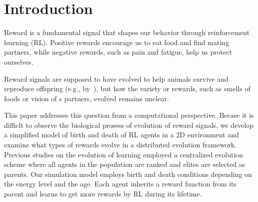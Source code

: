\section{Introduction}\label{sec:intro}
Reward is a fundamental signal that shapes our behavior through reinforcement learning (RL). 
Positive rewards encourage us to eat food and find mating partners, while negative rewards, such as pain and fatigue, help us protect ourselves. 

Reward signals are supposed to have evolved to help animals survive and reproduce offspring (e.g., by~\cite{schultzNeuronalRewardDecision2015}), but how the variety or rewards, such as smells of foods or vision of s partners, 
evolved remains unclear.

This paper addresses this question from a computational perspective. 
Becase it is difficlt to observe the biological prosess of evolution of reward signals, we develop a simplified model of birth and death of RL agents in a 2D environment and examine what types of rewards evolve in a
distributed evolution framework.
Previous studies on the evolution of learning \citep{hintonHowLearningCan1987,singhWhereRewardsCome2009} employed a centralized evolution scheme where all agents in the population are ranked and elites are selected as parents.
Our simulation model employs birth and death conditions depending on the energy level and the age. Each agent inherits a reward function from its parent and learns to get more rewards by RL during its lifetime. %

